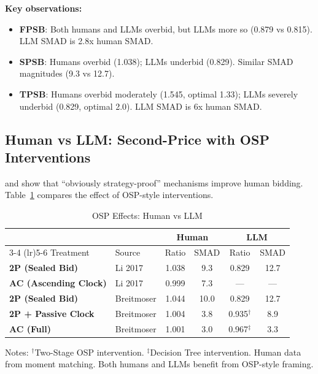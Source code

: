 \documentclass[12pt]{article}
\begin{document}
\textbf{Key observations:}
\begin{itemize}
    \item \textbf{FPSB}: Both humans and LLMs overbid, but LLMs more so (0.879 vs 0.815). LLM SMAD is 2.8x human SMAD.
    \item \textbf{SPSB}: Humans overbid (1.038); LLMs underbid (0.829). Similar SMAD magnitudes (9.3 vs 12.7).
    \item \textbf{TPSB}: Humans overbid moderately (1.545, optimal 1.33); LLMs severely underbid (0.829, optimal 2.0). LLM SMAD is 6x human SMAD.
\end{itemize}

\subsection{Human vs LLM: Second-Price with OSP Interventions}

\citet{li2017obviously} and \citet{breitmoser2022obviousness} show that ``obviously strategy-proof'' mechanisms improve human bidding. Table~\ref{tab:osp_comparison} compares the effect of OSP-style interventions.

\begin{table}[h]
\centering
\caption{OSP Effects: Human vs LLM}
\label{tab:osp_comparison}
\begin{tabular}{llcccc}
\toprule
& & \multicolumn{2}{c}{\textbf{Human}} & \multicolumn{2}{c}{\textbf{LLM}} \\
\cmidrule(lr){3-4} \cmidrule(lr){5-6}
Treatment & Source & Ratio & SMAD & Ratio & SMAD \\
\midrule
\textbf{2P (Sealed Bid)} & Li 2017 & 1.038 & 9.3 & 0.829 & 12.7 \\
\textbf{AC (Ascending Clock)} & Li 2017 & 0.999 & 7.3 & --- & --- \\
\midrule
\textbf{2P (Sealed Bid)} & Breitmoser & 1.044 & 10.0 & 0.829 & 12.7 \\
\textbf{2P + Passive Clock} & Breitmoser & 1.004 & 3.8 & 0.935$^\dagger$ & 8.9 \\
\textbf{AC (Full)} & Breitmoser & 1.001 & 3.0 & 0.967$^\ddagger$ & 3.3 \\
\bottomrule
\end{tabular}
\smallskip
\begin{minipage}{0.95\textwidth}
\footnotesize
Notes: $^\dagger$Two-Stage OSP intervention. $^\ddagger$Decision Tree intervention. Human data from moment matching. Both humans and LLMs benefit from OSP-style framing.
\end{minipage}
\end{table}
\end{document}
